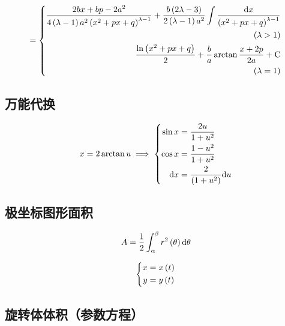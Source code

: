 \documentclass{article}
\begin{document}
\[=\left\{\begin{aligned}
        \frac{2bx+bp-2a^2}{4\left(\lambda-1\right)a^2\left(x^2+px+q\right)^{\lambda-1}}+\frac{b\left(2\lambda-3\right)}{2\left(\lambda-1\right)a^2}\int\frac{\mathrm d x}{\left(x^2+px+q\right)^{\lambda-1}} \\
        \left(\lambda>1\right)                                                                                                                                                \\
        \frac{\ln\left(x^2+px+q\right)}2+\frac ba\arctan{\frac{x+2p}{2a}}+\mathrm C                                                                                                  \\
        \left(\lambda=1\right)                                                                                                                                                \\
    \end{aligned}\right.\]

\subsection{万能代换}

\[x=2\arctan u\implies
    \left\{\begin{aligned}
        \sin x & =\frac{2u}{1+u^2}         \\
        \cos x & =\frac{1-u^2}{1+u^2}      \\
        \mathrm d x   & =\frac2{\left(1+u^2\right)}\mathrm d u
    \end{aligned}\right.\]

\subsection{极坐标图形面积}

\[A=\frac12\int_{\alpha}^{\beta}{r^2\left(\theta\right)\mathrm d\theta}\]

\begin{definition}[以下参数方程中都有]
    \[\left\{\begin{aligned}
            x & =x\left(t\right) \\
            y & =y\left(t\right)
        \end{aligned}\right.\]
\end{definition}

\subsection{旋转体体积（参数方程）}
\end{document}
